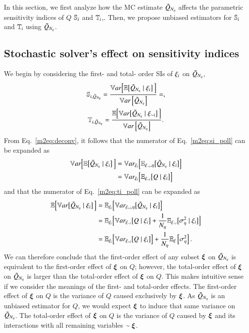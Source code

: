 In this section, we first analyze how the MC estimate $\Qpoll$ affects the parametric sensitivity indices of $Q$ $\S{i}$ and $\T{i}$,.
Then, we propose unbiased estimators for $\S{i}$ and $\T{i}$ using $\Qpoll$.

\subsection{Stochastic solver's effect on sensitivity indices}
We begin by considering the first- and total- order SIs of $\xii$ on $\Qpoll$,
\begin{gather}\label{m2eq:si_poll}
    \Spoll{i} = \frac{\VE{\Qpoll \mid \xii}}{\Var{\Qpoll}} = , \\ \label{m2eq:ti_poll}
    \Tpoll{i} = \frac{\EV{\Qpoll \mid \xini}}{\Var{\Qpoll}} .
\end{gather}
From Eq.~\eqref{m2eq:deconv}, it follows that the numerator of Eq.~\eqref{m2eq:si_poll} can be expanded as
\begin{align} \nonumber
    \VE{\Qpoll \mid \xii} &= \Vsub{\xii}\Brac{ \E{\xini,\eta} \brac{\Qpoll \mid \xii} } \\ \label{m2eq:ve-deconv}
    &= \Vsub{\xii} \Brac{\E{\xini} \brac{Q \mid \xii}} 
\end{align}
and that the numerator of Eq.~\eqref{m2eq:ti_poll} can be expanded as
\begin{align} \nonumber
    \EV{\Qpoll \mid \xii} &= \E{\xii} \Brac{ \Vsub{\xini,\eta} \brac{\Qpoll \mid \xii} } \\ \nonumber
    &= \E{\xii} \Brac{\Vsub{\xini} \brac{Q\mid \xii} + \frac{1}{\Neta}\E{\xini} \brac{\Sigsqeta \mid \xii}} \\ \label{m2eq:ev-deconv}
    &= \E{\xii} \Brac{\Vsub{\xini} \brac{Q \mid \xii}} + \frac{1}{\Neta}\EExi{\Sigsqeta} .
\end{align}
%
We can therefore conclude that the first-order effect of any subset $\bxi$ on $\Qpoll$ is equivalent to the first-order effect of $\bxi$ on $Q$; 
however, the total-order effect of $\bxi$ on $\Qpoll$ is larger than the total-order effect of $\bxi$ on $Q$.
This makes intuitive sense if we consider the meanings of the first- and total-order effects. 
The first-order effect of $\bxi$ on $Q$ is the variance of $Q$ caused exclusively by $\bxi$. 
As $\Qpoll$ is an unbiased estimator for $Q$, we would expect $\bxi$ to induce that same variance on $\Qpoll$. 
The total-order effect of $\bxi$ on $Q$ is the variance of $Q$ caused by $\bxi$ and its interactions with all remaining variables $\sim \bxi$. 
